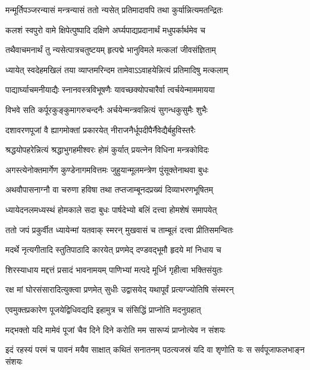 \twolineshloka
{मन्मूर्तिपञ्जरन्यासं मन्त्रन्यासं ततो न्यसेत्}
{प्रतिमादावपि तथा कुर्यान्नित्यमतन्द्रितः} %

\twolineshloka
{कलशं स्वपुरो वामे क्षिपेत्पुष्पादि दक्षिणे}
{अर्घ्यपाद्यप्रदानार्थं मधुपर्कार्थमेव च} %

\twolineshloka
{तथैवाचमनार्थं तु न्यसेत्पात्रचतुष्टयम्}
{हृत्पद्मे भानुविमले मत्कलां जीवसंज्ञिताम्} %

\twolineshloka
{ध्यायेत् स्वदेहमखिलं तया व्याप्तमरिन्दम}
{तामेवाऽऽवाहयेन्नित्यं प्रतिमादिषु मत्कलाम्} %

\twolineshloka
{पाद्यार्घ्याचमनीयाद्यैः स्नानवस्त्रविभूषणैः}
{यावच्छक्योपचारैर्वा त्वर्चयेन्माममायया} %

\twolineshloka
{विभवे सति कर्पूरकुङ्कुमागरुचन्दनैः}
{अर्चयेन्मन्त्रवन्नित्यं सुगन्धकुसुमैः शुभैः} %

\twolineshloka
{दशावरणपूजां वै ह्यागमोक्तां प्रकारयेत्}
{नीराजनैर्धूपदीपैर्नैवेद्यैर्बहुविस्तरैः} %

\twolineshloka
{श्रद्धयोपहरेन्नित्यं श्रद्धाभुगहमीश्वरः}
{होमं कुर्यात् प्रयत्नेन विधिना मन्त्रकोविदः} %

\twolineshloka
{अगस्त्येनोक्तमार्गेण कुण्डेनागमवित्तमः}
{जुहुयान्मूलमन्त्रेण पुंसूक्तेनाथवा बुधः} %

\twolineshloka
{अथवौपासनाग्नौ वा चरुणा हविषा तथा}
{तप्तजाम्बूनदप्रख्यं दिव्याभरणभूषितम्} %

\twolineshloka
{ध्यायेदनलमध्यस्थं होमकाले सदा बुधः}
{पार्षदेभ्यो बलिं दत्त्वा होमशेषं समापयेत्} %

\twolineshloka
{ततो जपं प्रकुर्वीत ध्यायेन्मां यतवाक् स्मरन्}
{मुखवासं च ताम्बूलं दत्त्वा प्रीतिसमन्वितः} %

\twolineshloka
{मदर्थे नृत्यगीतादि स्तुतिपाठादि कारयेत्}
{प्रणमेद् दण्डवद्भूमौ हृदये मां निधाय च} %

\twolineshloka
{शिरस्याधाय मद्दत्तं प्रसादं भावनामयम्}
{पाणिभ्यां मत्पदे मूर्ध्नि गृहीत्वा भक्तिसंयुतः} %

\twolineshloka
{रक्ष मां घोरसंसारादित्युक्त्वा प्रणमेत् सुधीः}
{उद्वासयेद् यथापूर्वं प्रत्यग्ज्योतिषि संस्मरन्} %

\twolineshloka
{एवमुक्तप्रकारेण पूजयेद्विधिवद्यदि}
{इहामुत्र च संसिद्धिं प्राप्नोति मदनुग्रहात्} %

\twolineshloka
{मद्भक्तो यदि मामेवं पूजां चैव दिने दिने}
{करोति मम सारूप्यं प्राप्नोत्येव न संशयः} %

\fourlineindentedshloka
{इदं रहस्यं परमं च पावनं}
{मयैव साक्षात् कथितं सनातनम्}
{पठत्यजस्रं यदि वा शृणोति यः}
{स सर्वपूजाफलभाङ्न संशयः} %


